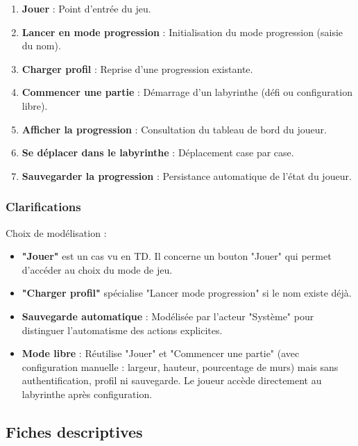 \documentclass{butexFR}
\begin{document}
\begin{enumerate}
    \item \textbf{Jouer} : Point d'entrée du jeu.
    \item \textbf{Lancer en mode progression} : Initialisation du mode progression (saisie du nom).
    \item \textbf{Charger profil} : Reprise d'une progression existante.
    \item \textbf{Commencer une partie} : Démarrage d'un labyrinthe (défi ou configuration libre).
    \item \textbf{Afficher la progression} : Consultation du tableau de bord du joueur.
    \item \textbf{Se déplacer dans le labyrinthe} : Déplacement case par case.
    \item \textbf{Sauvegarder la progression} : Persistance automatique de l'état du joueur.
\end{enumerate}

\subsubsection{Clarifications}

Choix de modélisation :

\begin{itemize}
    \item \textbf{"Jouer"} est un cas vu en TD. Il concerne un bouton "Jouer" qui permet d'accéder au choix du mode de jeu.
    \item \textbf{"Charger profil"} spécialise "Lancer mode progression" si le nom existe déjà.

    \item \textbf{Sauvegarde automatique} : Modélisée par l'acteur "Système" pour distinguer l'automatisme des actions explicites.

    \item \textbf{Mode libre} : Réutilise "Jouer" et "Commencer une partie" (avec configuration manuelle : largeur, hauteur, pourcentage de murs) mais sans authentification, profil ni sauvegarde. Le joueur accède directement au labyrinthe après configuration.
\end{itemize}

\newpage

\subsection{Fiches descriptives}
\end{document}
